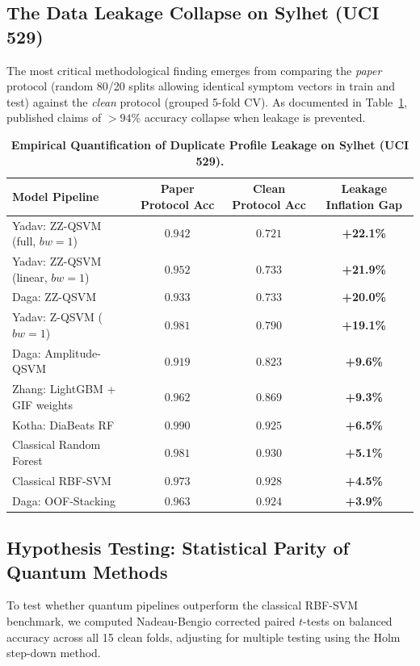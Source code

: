 \documentclass[11pt,a4paper]{article}
\newcommand{\BAD}[1]{\textcolor{bad}{\textbf{#1}}}
\begin{document}
\subsection{The Data Leakage Collapse on Sylhet (UCI 529)}
The most critical methodological finding emerges from comparing the \emph{paper} protocol (random 80/20 splits allowing identical symptom vectors in train and test) against the \emph{clean} protocol (grouped 5-fold CV). As documented in Table~\ref{tab:leakage_gap}, published claims of $>94\%$ accuracy collapse when leakage is prevented.

\begin{table}[H]
\centering\footnotesize
\caption{\textbf{Empirical Quantification of Duplicate Profile Leakage on Sylhet (UCI 529).}}
\label{tab:leakage_gap}
\begin{tabular}{lccc}
\toprule
\textbf{Model Pipeline} & \textbf{Paper Protocol Acc} & \textbf{Clean Protocol Acc} & \textbf{Leakage Inflation Gap} \\
\midrule
Yadav: ZZ-QSVM (full, $bw=1$) & $0.942$ & $0.721$ & \BAD{+22.1\%} \\
Yadav: ZZ-QSVM (linear, $bw=1$) & $0.952$ & $0.733$ & \BAD{+21.9\%} \\
Daga: ZZ-QSVM & $0.933$ & $0.733$ & \BAD{+20.0\%} \\
Yadav: Z-QSVM ($bw=1$) & $0.981$ & $0.790$ & \BAD{+19.1\%} \\
Daga: Amplitude-QSVM & $0.919$ & $0.823$ & \BAD{+9.6\%} \\
Zhang: LightGBM + GIF weights & $0.962$ & $0.869$ & \BAD{+9.3\%} \\
Kotha: DiaBeats RF & $0.990$ & $0.925$ & \BAD{+6.5\%} \\
Classical Random Forest & $0.981$ & $0.930$ & \BAD{+5.1\%} \\
Classical RBF-SVM & $0.973$ & $0.928$ & \BAD{+4.5\%} \\
Daga: OOF-Stacking & $0.963$ & $0.924$ & \BAD{+3.9\%} \\
\bottomrule
\end{tabular}
\end{table}

\subsection{Hypothesis Testing: Statistical Parity of Quantum Methods}
To test whether quantum pipelines outperform the classical RBF-SVM benchmark, we computed Nadeau-Bengio corrected paired $t$-tests on balanced accuracy across all 15 clean folds, adjusting for multiple testing using the Holm step-down method.
\end{document}
